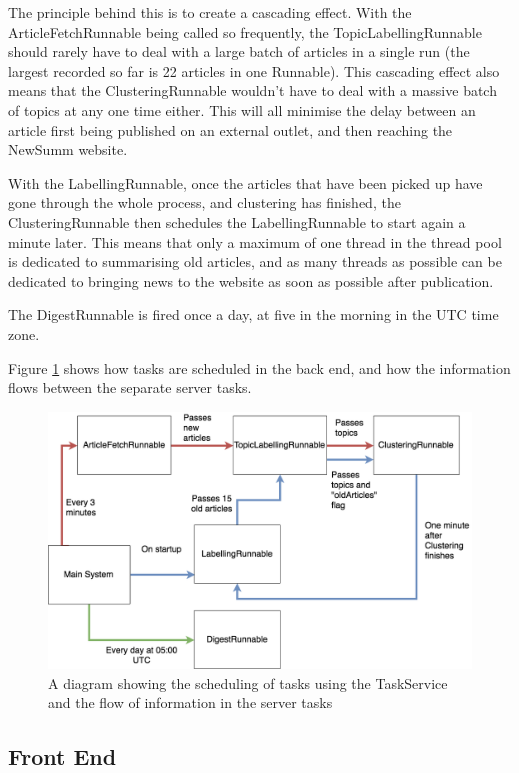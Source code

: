 \documentclass[12pt]{article}
\begin{document}
The principle behind this is to create a cascading effect. With the ArticleFetchRunnable being called so frequently, the TopicLabellingRunnable should rarely have to deal with a large batch of articles in a single run (the largest recorded so far is 22 articles in one Runnable). This cascading effect also means that the ClusteringRunnable wouldn't have to deal with a massive batch of topics at any one time either. This will all minimise the delay between an article first being published on an external outlet, and then reaching the NewSumm website.

With the LabellingRunnable, once the articles that have been picked up have gone through the whole process, and clustering has finished, the ClusteringRunnable then schedules the LabellingRunnable to start again a minute later. This means that only a maximum of one thread in the thread pool is dedicated to summarising old articles, and as many threads as possible can be dedicated to bringing news to the website as soon as possible after publication.

The DigestRunnable is fired once a day, at five in the morning in the UTC time zone.

Figure \ref{servertasks} shows how tasks are scheduled in the back end, and how the information flows between the separate server tasks.

\begin{figure}[ht!]
  \centering
    \includegraphics[scale=0.3]{TaskService.png}
   \caption[A diagram showing the scheduling of tasks]{A diagram showing the scheduling of tasks using the TaskService and the flow of information in the server tasks}
   \label{servertasks}
\end{figure} 

\subsection{Front End}
\end{document}
